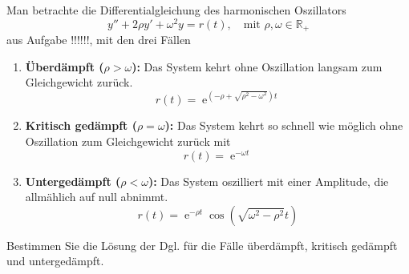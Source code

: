 {
Man betrachte die Differentialgleichung des harmonischen Oszillators
\[
y'' + 2\rho y' + \omega^2 y = r(t), \quad \text{mit } \rho, \omega \in \mathbb R_+
\]
aus Aufgabe !!!!!!, %
mit den drei Fällen
\begin{enumerate}
  \item \textbf{Überdämpft (\( \rho > \omega \)):} Das System kehrt ohne Oszillation langsam zum Gleichgewicht zurück.
  $$
  r(t) = \operatorname{e}^{(-\rho + \sqrt{\rho^2 - \omega^2})t}
  $$
  \item \textbf{Kritisch gedämpft (\( \rho = \omega \)):} Das System kehrt so schnell wie möglich ohne Oszillation zum Gleichgewicht zurück mit
  $$
  r(t) = \operatorname{e}^{-\omega t}
  $$
  \item \textbf{Untergedämpft (\( \rho < \omega \)):} Das System oszilliert mit einer Amplitude, die allmählich auf null abnimmt.
  $$
  r(t) = \operatorname{e}^{-\rho t} \cos(\sqrt{\omega^2 - \rho^2}t)
  $$
\end{enumerate}
Bestimmen Sie die Lösung der Dgl. für die Fälle überdämpft, kritisch gedämpft und untergedämpft.
}



